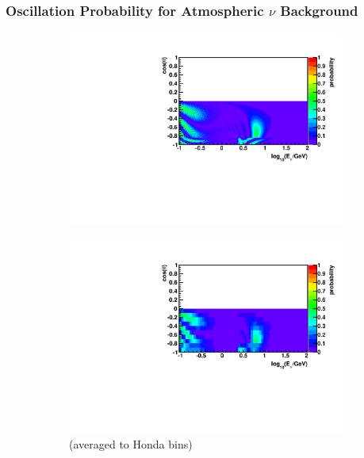 \documentclass{beamer}
\begin{document}
\begin{frame}
	\frametitle{Oscillation Probability for Atmospheric $\nu$ Background}
	\begin{figure}
		\begin{subfigure}[]{0.45\linewidth}
			\centering
			\vspace{-15pt}
			\caption{ $\nu_{\mu} \rightarrow \nu_{e}$ }
			\vspace{-8pt}
			\includegraphics[width=\linewidth]{atm_numu2nue.pdf} \\
			\vspace{-10pt}
			\caption*{(averaged to Honda bins)}
			\vspace{-8pt}
			\includegraphics[width=\linewidth]{atm_numu2nue_avg.pdf}
		\end{subfigure}
		\begin{subfigure}[]{0.45\linewidth}

\end{subfigure}
\end{figure}
\end{frame}
\end{document}
